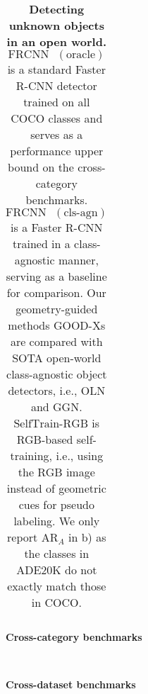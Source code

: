 \documentclass{article} \usepackage{iclr2023_conference,times}
\begin{document}
\begin{table}[t]
\begin{subtable}{\linewidth}
{{{\begin{tabular}{l|l|l|l|l|l|l|l|l|l|l}
                  \bottomrule
						\end{tabular}
}}}
    \caption{\textbf{Cross-category benchmarks}}\label{table:cross-category-main}
\end{subtable}\\ \vspace{3pt}
\begin{subtable}{\linewidth}
\centering
{}
    \caption{\textbf{Cross-dataset benchmarks}}\label{table:cross-dataset-main}
\end{subtable}
\caption{\textbf{Detecting unknown objects in an open world.} $\mathrm{FRCNN\text{ }(oracle)}$ is a standard Faster R-CNN detector trained on all COCO classes and serves as a performance upper bound on the cross-category benchmarks. 
    $\mathrm{FRCNN\text{ } (cls\text{-}agn)}$ is a Faster R-CNN trained in a class-agnostic manner, serving as a baseline for comparison.
    Our geometry-guided methods $\mathrm{GOOD}$-$\mathrm{X}$s are compared with SOTA open-world class-agnostic object detectors, i.e., OLN and GGN. $\mathrm{SelfTrain\text{-}RGB}$ is RGB-based self-training, i.e., using the RGB image instead of geometric cues for pseudo labeling. We only report AR$_A$ in b) as the classes in ADE20K do not exactly match those in COCO.}\label{table: main_results}
\end{table}
 
\end{document}

